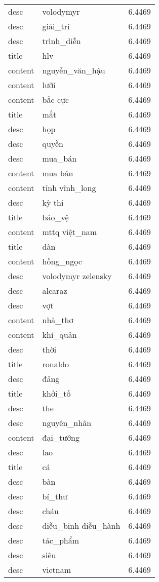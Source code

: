 \documentclass{article}
\begin{document}
\begin{tabular}{lll}
desc & volodymyr & 6.4469\\
desc & giải\_trí & 6.4469\\
desc & trình\_diễn & 6.4469\\
title & hlv & 6.4469\\
content & nguyễn\_văn\_hậu & 6.4469\\
content & lưỡi & 6.4469\\
content & bắc cực & 6.4469\\
title & mắt & 6.4469\\
desc & họp & 6.4469\\
desc & quyền & 6.4469\\
desc & mua\_bán & 6.4469\\
content & mua bán & 6.4469\\
content & tỉnh vĩnh\_long & 6.4469\\
desc & kỳ thi & 6.4469\\
title & bảo\_vệ & 6.4469\\
content & mttq việt\_nam & 6.4469\\
title & dàn & 6.4469\\
content & hồng\_ngọc & 6.4469\\
desc & volodymyr zelensky & 6.4469\\
desc & alcaraz & 6.4469\\
desc & vợt & 6.4469\\
content & nhà\_thơ & 6.4469\\
content & khí\_quản & 6.4469\\
desc & thời & 6.4469\\
title & ronaldo & 6.4469\\
desc & đảng & 6.4469\\
title & khởi\_tố & 6.4469\\
desc & the & 6.4469\\
desc & nguyên\_nhân & 6.4469\\
content & đại\_tướng & 6.4469\\
desc & lao & 6.4469\\
title & cá & 6.4469\\
desc & bàn & 6.4469\\
desc & bí\_thư & 6.4469\\
desc & cháu & 6.4469\\
desc & diễu\_binh diễu\_hành & 6.4469\\
desc & tác\_phẩm & 6.4469\\
desc & siêu & 6.4469\\
desc & vietnam & 6.4469\\

\end{tabular}
\end{document}
